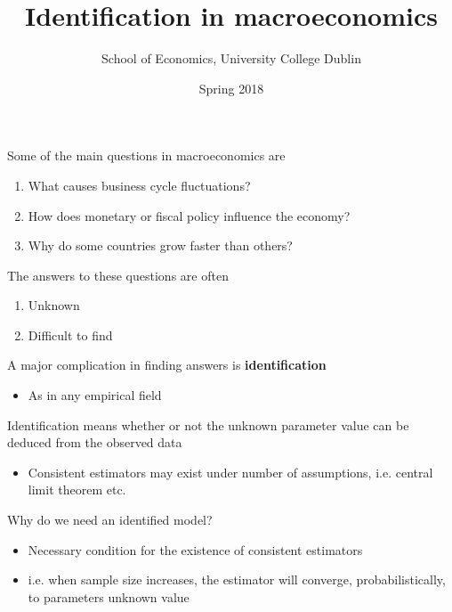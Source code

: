 \documentclass{beamer}
\title{Identification in macroeconomics}
\author{School of Economics, University College Dublin}
\date{Spring 2018}
\begin{document}
\begin{frame}
 \titlepage
\end{frame}

\begin{frame} 
  Some of the main questions in macroeconomics are
  \medskip
  \begin{enumerate}
    \item What causes business cycle fluctuations?
    \item How does monetary or fiscal policy influence the economy?
    \medskip
    \item Why do some countries grow faster than others?
  \end{enumerate}  
\end{frame}

\begin{frame}
  The answers to these questions are often   
  \begin{enumerate}
    \item Unknown
    \item Difficult to find
  \end{enumerate}
\end{frame}

\begin{frame}
  A major complication in finding answers is \textbf{identification}
  \begin{itemize}
    \item As in any empirical field
  \end{itemize}
  \medskip
  Identification means whether or not the unknown parameter value can be deduced from the observed data  
  \begin{itemize}
    \item Consistent estimators may exist under number of assumptions, i.e. central limit theorem etc.
  \end{itemize}
\end{frame}

\begin{frame}
  Why do we need an identified model?  
  \begin{itemize}
    \item Necessary condition for the existence of consistent estimators
    \item i.e. when sample size increases, the estimator will converge, probabilistically, to parameters unknown value
  \end{itemize}  
\end{frame}
\end{document}
